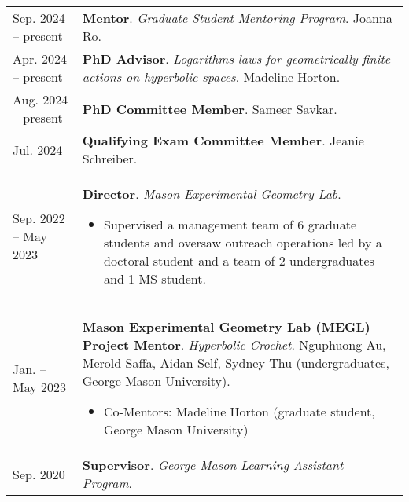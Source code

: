
    \medskip


    \medskip
    
    \begin{center}
    {
    \renewcommand{\arraystretch}{1.5}
    \begin{longtable}{p{}  p{}}
     Sep.  2024 --    present & \textbf{Mentor}. \textit{Graduate Student Mentoring Program}.  Joanna Ro.  \\ 
 Apr.  2024 --    present & \textbf{PhD Advisor}. \textit{Logarithms laws for geometrically finite actions on hyperbolic spaces}.  Madeline Horton.  \\ 
 Aug.  2024 --    present & \textbf{PhD Committee Member}.  Sameer Savkar.  \\ 
 Jul.  2024 & \textbf{Qualifying Exam Committee Member}.  Jeanie Schreiber.  \\ 
 Sep.  2022 --  May  2023 & \textbf{Director}. \textit{Mason Experimental Geometry Lab}. 
        \hspace{-1em}

        {\small
        \begin{itemize}
        \setlength{\parindent}{0em}
        \item[] Supervised a management team of 6 graduate students and oversaw outreach operations led by a doctoral student and a team of 2 undergraduates and 1 MS student.
        \end{itemize}
        }
        \vspace{-1em}
         \\ 
 Jan.  --  May  2023 & \textbf{Mason Experimental Geometry Lab (MEGL) Project Mentor}. \textit{Hyperbolic Crochet}.  Nguphuong Au, Merold Saffa, Aidan Self, Sydney Thu (undergraduates, George Mason University). 
        \hspace{-1em}

        {\small
        \begin{itemize}
        \setlength{\parindent}{0em}
        \item[] 
            Co-Mentors: Madeline Horton (graduate student, George Mason University) 
        \end{itemize}
        }
        \vspace{-1em}
         \\ 
 Sep.  2020 & \textbf{Supervisor}. \textit{George Mason Learning Assistant Program}. 
        \hspace{-1em}


\end{longtable}}
\end{center}
